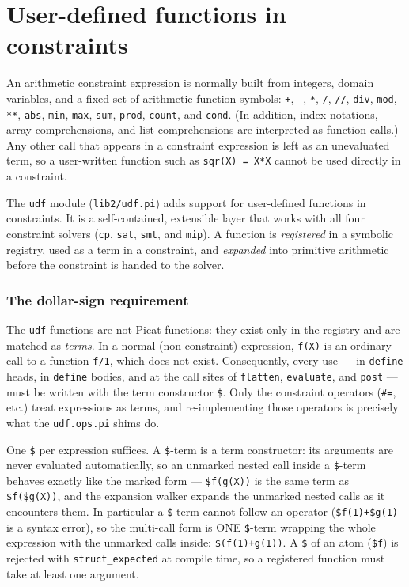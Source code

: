 \section{\label{ch:udf}User-defined functions in constraints}

An arithmetic constraint expression is
normally built from integers, domain variables, and a fixed set of arithmetic
function symbols: \texttt{+}, \texttt{-}, \texttt{*}, \texttt{/},
\texttt{//}, \texttt{div}, \texttt{mod}, \texttt{**}, \texttt{abs},
\texttt{min}, \texttt{max}, \texttt{sum}, \texttt{prod},
\texttt{count}, and \texttt{cond}.  (In addition, index notations,
array comprehensions, and list comprehensions are interpreted as function
calls.)  Any other call that appears in a constraint expression is left as an
unevaluated term, so a user-written function such as
\texttt{sqr(X) = X*X} cannot be used directly in a constraint.

The \texttt{udf} module (\texttt{lib2/udf.pi}) adds
support for user-defined functions in constraints.  It is a
self-contained, extensible layer that works with all four constraint
solvers (\texttt{cp}, \texttt{sat}, \texttt{smt}, and \texttt{mip}).
A function is \emph{registered} in a symbolic registry, used as a term in
a constraint, and \emph{expanded} into primitive arithmetic before the
constraint is handed to the solver.

\subsubsection{The dollar-sign requirement}

The \texttt{udf} functions are not Picat functions: they exist only in the
registry and are matched as \emph{terms}.  In a normal
(non-constraint) expression, \texttt{f(X)} is an ordinary call to a
function \texttt{f/1}, which does not exist.  Consequently, every use
--- in \texttt{define} heads, in \texttt{define} bodies, and at the call
sites of \texttt{flatten}, \texttt{evaluate}, and \texttt{post} --- must
be written with the term constructor \texttt{\$}.  Only the constraint
operators (\texttt{\#=}, etc.) treat expressions as terms, and re-implementing
those operators is precisely what the \texttt{udf.ops.pi} shims do.

One \texttt{\$} per expression suffices.  A \texttt{\$}-term is a term
constructor: its arguments are never evaluated automatically, so an
unmarked nested call inside a \texttt{\$}-term behaves exactly like the
marked form --- \texttt{\$f(g(X))} is the same term as
\texttt{\$f(\$g(X))}, and the expansion walker expands the unmarked
nested calls as it encounters them.  In particular a \texttt{\$}-term
cannot follow an operator (\texttt{\$f(1)+\$g(1)} is a syntax error), so
the multi-call form is ONE \texttt{\$}-term wrapping the whole expression
with the unmarked calls inside: \texttt{\$(f(1)+g(1))}.  A \texttt{\$}
of an atom (\texttt{\$f}) is rejected with \texttt{struct\_expected} at
compile time, so a registered function must take at least one argument.

